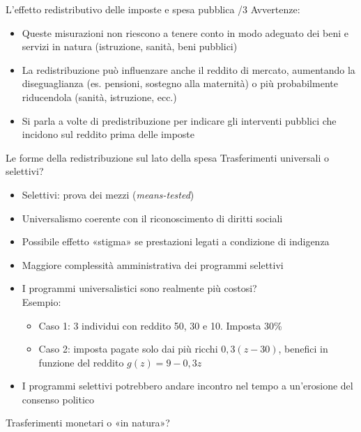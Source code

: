 \documentclass[11pt]{beamer}
\begin{document}
\begin{frame}{L'effetto redistributivo delle imposte e spesa pubblica /3}
Avvertenze:
\begin{itemize}
\item Queste misurazioni non riescono a tenere conto in modo adeguato dei beni e servizi in natura (istruzione, sanità, beni pubblici)
\item La redistribuzione può influenzare anche il reddito di mercato, aumentando la diseguaglianza (es. pensioni, sostegno alla maternità) o più probabilmente riducendola (sanità, istruzione, ecc.)
\item Si parla a volte di \alert{predistribuzione} per indicare gli interventi pubblici che incidono sul reddito prima delle imposte
\end{itemize}
\end{frame}

\begin{frame}{Le forme della redistribuzione sul lato della spesa}
Trasferimenti universali o selettivi?
\begin{itemize}
\item Selettivi: prova dei mezzi (\emph{means-tested})
\item Universalismo coerente con il riconoscimento di diritti sociali
\item Possibile effetto «stigma» se prestazioni legati a condizione di indigenza
\item Maggiore complessità amministrativa dei programmi selettivi
\item I programmi universalistici sono realmente più costosi?\\[0pt]
Esempio:
\begin{itemize}
\item Caso 1: 3 individui con reddito 50, 30 e 10. Imposta 30\%
\item Caso 2: imposta pagate solo dai più ricchi $0,3(z-30)$, benefici in funzione del reddito $g(z)=9-0,3z$
\end{itemize}
\item I programmi selettivi potrebbero andare incontro nel tempo a un'erosione
del consenso politico
\end{itemize}
Trasferimenti monetari o «in natura»?
\end{frame}
\end{document}
